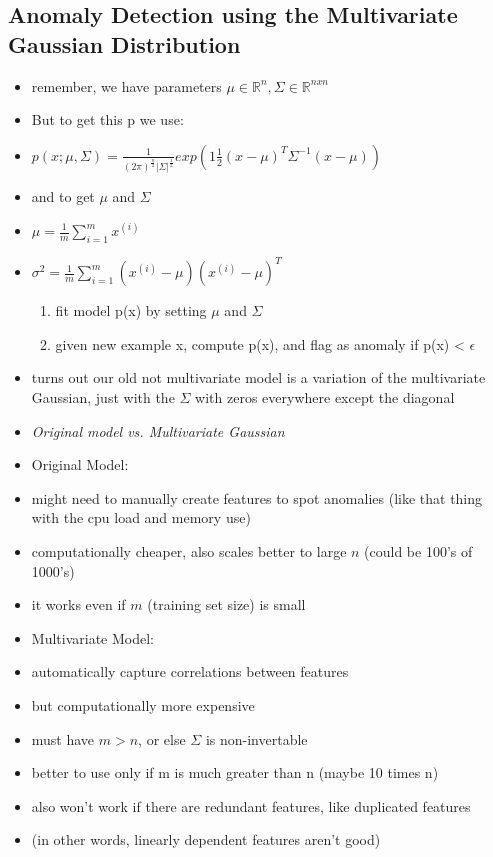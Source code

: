 \documentclass[]{article}
\begin{document}
	\subsection{Anomaly Detection using the Multivariate Gaussian Distribution}
		\begin{itemize}
			\item remember, we have parameters $\mu \in \mathbb{R}^n,\Sigma \in \mathbb{R}^{n x n}$
			\item But to get this p we use:
			\item $p(x;\mu,\Sigma)=\frac{1}{(2\pi)^{\frac{n}{2}}|\Sigma|^{\frac{1}{2}}}exp(1\frac{1}{2}(x-\mu)^T\Sigma^{-1}(x-\mu))$
			\item and to get $\mu$ and $\Sigma$
			\item $\mu = \frac{1}{m} \sum\limits_{i=1}^{m} x^{(i)}$
			\item $\sigma^2 = \frac{1}{m}\sum\limits_{i=1}^{m} (x^{(i)}-\mu)(x^{(i)}-\mu)^T$
			\begin{enumerate}
				\item fit model p(x) by setting $\mu$ and $\Sigma$
				\item given new example x, compute p(x), and flag as anomaly if p(x) < $\epsilon$
			\end{enumerate}
			\item turns out our old not multivariate model is a variation of the multivariate Gaussian, just with the $\Sigma$ with zeros everywhere except the diagonal
			\item \emph{Original model vs. Multivariate Gaussian}
			\item Original Model:
			\item might need to manually create features to spot anomalies (like that thing with the cpu load and memory use)
			\item computationally cheaper, also scales better to large $n$ (could be 100's of 1000's)
			\item it works even if $m$ (training set size) is small
			\item Multivariate Model:
			\item automatically capture correlations between features
			\item but computationally more expensive
			\item must have $m > n$, or else $\Sigma$ is non-invertable
			\item better to use only if m is much greater than n (maybe 10 times n)
			\item also won't work if there are redundant features, like duplicated features
			\item (in other words, linearly dependent features aren't good)
		\end{itemize}
		
\end{document}
